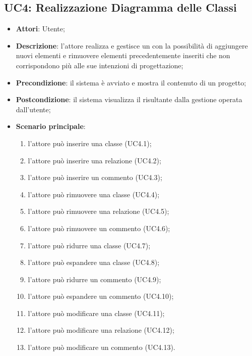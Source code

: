 \subsection{UC4: Realizzazione Diagramma delle Classi}
\label{UC4}
\begin{itemize}
	\item \textbf{Attori}: Utente;
	\item \textbf{Descrizione}: l'attore realizza e gestisce un  con la possibilità di aggiungere nuovi elementi e rimuovere elementi precedentemente inseriti che non corrispondono più alle sue intenzioni di progettazione;
	\item \textbf{Precondizione}: il sistema è avviato e mostra il contenuto di un progetto;
	\item \textbf{Postcondizione}: il sistema visualizza il  risultante dalla gestione operata dall'utente;
	\item \textbf{Scenario principale}:
	\begin{enumerate}
		\item l'attore può inserire una classe (UC4.1);
		\item l'attore può inserire una relazione (UC4.2);
		\item l'attore può inserire un commento (UC4.3);
		\item l'attore può rimuovere una classe (UC4.4);
		\item l'attore può rimuovere una relazione (UC4.5);
		\item l'attore può rimuovere un commento (UC4.6);
		\item l'attore può ridurre una classe (UC4.7);
		\item l'attore può espandere una classe (UC4.8);
		\item l'attore può ridurre un commento (UC4.9);
		\item l'attore può espandere un commento (UC4.10);
		\item l'attore può modificare una classe (UC4.11);
		\item l'attore può modificare una relazione (UC4.12);
		\item l'attore può modificare un commento (UC4.13).
	\end{enumerate}
\end{itemize}

